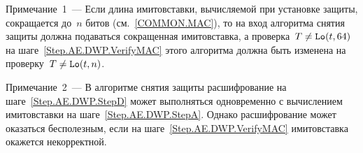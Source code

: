 \begin{note}
Примечание~1~--- Если длина имитовставки, вычисляемой при установке защиты, 
сокращается до~$n$ битов (см.~\ref{COMMON.MAC}), то на вход алгоритма снятия 
защиты должна подаваться сокращенная имитовставка, а проверка~$T\neq\mathop{\texttt{Lo}}\nolimits(t,64)$ 
на шаге~\ref{Step.AE.DWP.VerifyMAC} этого алгоритма должна быть изменена на 
проверку~$T\neq\mathop{\texttt{Lo}}\nolimits(t,n)$.
\end{note}

\begin{note}
Примечание~2~--- В алгоритме снятия защиты расшифрование на 
шаге~\ref{Step.AE.DWP.StepD} может выполняться одновременно 
с вычислением имитовставки на шаге~\ref{Step.AE.DWP.StepA}. 
Однако расшифрование может оказаться бесполезным, если на 
шаге~\ref{Step.AE.DWP.VerifyMAC} имитовставка окажется некорректной.
\end{note}